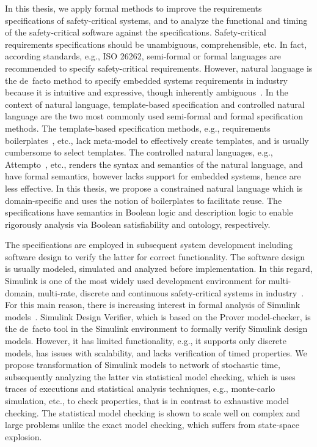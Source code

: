 In this thesis, we apply formal methods to improve the requirements specifications of safety-critical systems, and to analyze the functional and timing of the safety-critical software against the specifications. Safety-critical requirements specifications should be unambiguous, comprehensible, etc. In fact, according standards, e.g., ISO 26262, semi-formal or formal languages are recommended to specify safety-critical requirements. However, natural language is the de~facto method to specify embedded systems requirements in industry because it is intuitive and expressive, though inherently ambiguous~\cite{ieereqspecstandard}. In the context of natural language, template-based specification and controlled natural language are the two most commonly used semi-formal and formal specification methods. The template-based specification methods, e.g., requirements boilerplates~\cite{Hull2011RequirementsEngineering}, etc., lack meta-model to effectively create templates, and is usually cumbersome to select templates. The controlled natural languages, e.g., Attempto~\cite{attempto96}\cite{Fuchs2008AttemptoRepresentation}, etc., renders the syntax and semantics of the natural language, and have formal semantics, however lacks support for embedded systems, hence are less effective. In this thesis, we propose a constrained natural language which is domain-specific and uses the notion of boilerplates to facilitate reuse. The specifications have semantics in Boolean logic and description logic to enable rigorously analysis via Boolean satisfiability and ontology, respectively.

The specifications are employed in subsequent system development including software design to verify the latter for correct functionality. The software design is usually modeled, simulated and analyzed before implementation. In this regard, Simulink is one of the most widely used development environment for multi-domain, multi-rate, discrete and continuous safety-critical systems in industry~\cite{JamesB.Dabney2003MasteringSimulink}. For this main reason, there is increasing interest in formal analysis of Simulink models~\cite{Manamcheri2011AModels}\cite{Sims2007ExperienceReport}. Simulink Design Verifier, which is based on the Prover model-checker, is the de~facto tool in the Simulink environment to formally verify Simulink design models. However, it has limited functionality, e.g., it supports only discrete models, has issues with scalability, and lacks verification of timed properties.  We propose transformation of Simulink models to network of stochastic time, subsequently analyzing the latter via statistical model checking, which is uses traces of executions and statistical analysis techniques, e.g., monte-carlo simulation, etc., to check properties, that is in contrast to exhaustive model checking. The statistical model checking is shown to scale well on complex and large problems unlike the exact model checking, which suffers from state-space explosion.

